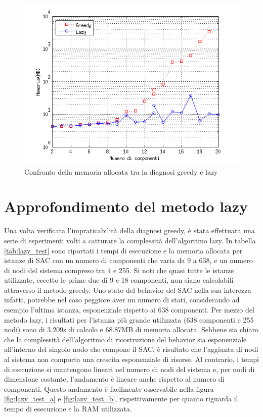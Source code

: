 \begin{figure}[htbp]
\centering
\includegraphics[scale=0.7]{./Img/sperimentazione/confronto_ram.png}
\caption{Confronto della memoria allocata tra la diagnosi greedy e lazy}
\label{fig:confronto_ram}
\end{figure}

\section{Approfondimento del metodo lazy}
Una volta verificata l'impraticabilità della diagnosi greedy, è stata effettuata una serie di esperimenti volti a catturare la complessità dell'algoritmo lazy.
In tabella \ref{tab:lazy_test} sono riportati i tempi di esecuzione e la memoria allocata per istanze di SAC con un numero di componenti che varia da 9 a 638, e un numero di nodi del sistema compreso tra 4 e 255.
Si noti che quasi tutte le istanze utilizzate, eccetto le prime due di 9 e 18 componenti, non siano calcolabili attraverso il metodo greedy. Uno stato del behavior del SAC nella sua interezza infatti, potrebbe nel caso peggiore aver un numero di stati, considerando ad esempio l'ultima istanza, esponenziale rispetto ai 638 componenti. 
Per mezzo del metodo lazy, i risultati per l'istanza più grande utilizzata (638 componenti e 255 nodi) sono di 3.209s di calcolo e 68.87MB di memoria allocata.
Sebbene sia chiaro che la complessità dell'algoritmo di ricostruzione del behavior sia esponenziale all'interno del singolo nodo che compone il SAC, è risultato che l'aggiunta di nodi al sistema non comporta una crescita esponenziale di risorse. Al contrario, i tempi di esecuzione si mantengono lineari nel numero di nodi del sistema e, per nodi di dimensione costante, l'andamento è lineare anche rispetto al numero di componenti. Questo andamento è facilmente osservabile nella figura \ref{fig:lazy_test_a} e \ref{fig:lazy_test_b}, rispettivamente per quanto riguarda il tempo di esecuzione e la RAM utilizzata.

